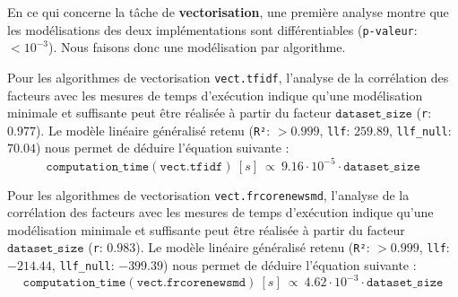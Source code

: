 			
			En ce qui concerne la tâche de \textbf{vectorisation}, une première analyse montre que les modélisations des deux implémentations sont différentiables (\texttt{p-valeur}: $< 10^{-3}$). Nous faisons donc une modélisation par algorithme.
		
			Pour les algorithmes de vectorisation \texttt{vect.tfidf}, l'analyse de la corrélation des facteurs avec les mesures de temps d'exécution indique qu'une modélisation minimale et suffisante peut être réalisée à partir du facteur $\texttt{dataset\_size}$ (\texttt{r}: $0.977$).
			Le modèle linéaire généralisé retenu (\texttt{R²}: $> 0.999$, \texttt{llf}: $259.89$, \texttt{llf\_null}: $70.04$) nous permet de déduire l'équation suivante :
			\begin{equation}
				\texttt{computation\_time}(\texttt{vect.tfidf})~[s]~
				\propto~9.16 \cdot 10^{-5} \cdot \texttt{dataset\_size}
			\end{equation}
			
			Pour les algorithmes de vectorisation \texttt{vect.frcorenewsmd}, l'analyse de la corrélation des facteurs avec les mesures de temps d'exécution indique qu'une modélisation minimale et suffisante peut être réalisée à partir du facteur $\texttt{dataset\_size}$ (\texttt{r}: $0.983$).
			Le modèle linéaire généralisé retenu (\texttt{R²}: $> 0.999$, \texttt{llf}: $-214.44$, \texttt{llf\_null}: $-399.39$) nous permet de déduire l'équation suivante :
			\begin{equation}
				\texttt{computation\_time}(\texttt{vect.frcorenewsmd})~[s]~
				\propto~4.62 \cdot 10^{-3} \cdot \texttt{dataset\_size}
			\end{equation}
			
